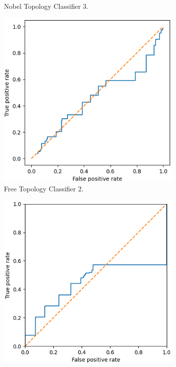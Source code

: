 \begin{figure}[H]
\begin{subfigure}[H]{0.475\textwidth}
        \caption{Nobel Topology Classifier 3.}
    \end{subfigure}
    \begin{subfigure}[H]{0.475\textwidth}
        \includegraphics[width=\textwidth]{figs/results/metric_normilisation/france_ac2.png}
        \caption{Free Topology Classifier 2.}
    \end{subfigure}
    \begin{subfigure}[H]{0.475\textwidth}
        \includegraphics[width=\textwidth]{figs/results/metric_normilisation/france_ac3.png}

\end{subfigure}
\end{figure}
